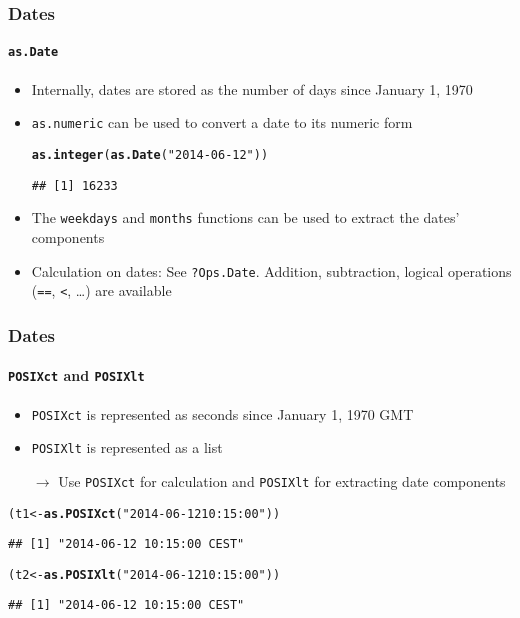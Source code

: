 \documentclass[paper=screen,mathserif]{beamer}\usepackage[]{graphicx}\usepackage[]{color}
\makeatletter
\newcommand{\hlstr}[1]{\textcolor[rgb]{0.192,0.494,0.8}{#1}}%
\newcommand{\hlstd}[1]{\textcolor[rgb]{0.345,0.345,0.345}{#1}}%
\newcommand{\hlkwb}[1]{\textcolor[rgb]{0.69,0.353,0.396}{#1}}%
\newcommand{\hlkwd}[1]{\textcolor[rgb]{0.737,0.353,0.396}{\textbf{#1}}}%
\newenvironment{kframe}{%
 \def\at@end@of@kframe{}%
 \ifinner\ifhmode%
  \def\at@end@of@kframe{\end{minipage}}%
  \begin{minipage}{\columnwidth}%
 \fi\fi%
 \def\FrameCommand##1{\hskip\@totalleftmargin \hskip-\fboxsep
 \colorbox{shadecolor}{##1}\hskip-\fboxsep
     \hskip-\linewidth \hskip-\@totalleftmargin \hskip\columnwidth}%
 \MakeFramed {\advance\hsize-\width
   \@totalleftmargin\z@ \linewidth\hsize
   \@setminipage}}%
 {\par\unskip\endMakeFramed%
 \at@end@of@kframe}
\newenvironment{knitrout}{}{} %
\newcommand{\ft}[1]{\frametitle{#1}}
\newcommand{\fst}[1]{\framesubtitle{#1}}
\makeatother
\begin{document}
\begin{frame}[fragile]
  \ft{Dates}
  \fst{{\tt as.Date}}
  
  \begin{itemize}
  \item Internally, dates are stored as the number of days since
    January 1, 1970
  \item {\tt as.numeric} can be used to convert a date to its numeric form
\begin{knitrout}\small
{}\color{fgcolor}\begin{kframe}
\begin{alltt}
\hlkwd{as.integer}\hlstd{(}\hlkwd{as.Date}\hlstd{(}\hlstr{"2014-06-12"}\hlstd{))}
\end{alltt}
\begin{verbatim}
## [1] 16233
\end{verbatim}
\end{kframe}
\end{knitrout}
  \item The \verb=weekdays= and \verb=months= functions can be used to
    extract the dates' components
  \item Calculation on dates: See \verb=?Ops.Date=. Addition,
    subtraction, logical operations (\verb|==|, \verb=<=, \dots) are
    available

  \end{itemize}
\end{frame}

\begin{frame}[fragile]
  \ft{Dates}
  \fst{{\tt POSIXct} and {\tt POSIXlt}}
  
  \begin{itemize}
  \item \verb=POSIXct= is represented as seconds since January 1, 1970 GMT
  \item \verb=POSIXlt= is represented as a list
    \vspace{0.3cm}
    
    $\rightarrow$ Use \verb=POSIXct= for calculation and
    \verb=POSIXlt= for extracting date components
  \end{itemize}
  
\begin{knitrout}\scriptsize
{}\color{fgcolor}\begin{kframe}
\begin{alltt}
\hlstd{(t1} \hlkwb{<-} \hlkwd{as.POSIXct}\hlstd{(}\hlstr{"2014-06-12 10:15:00"}\hlstd{))}
\end{alltt}
\begin{verbatim}
## [1] "2014-06-12 10:15:00 CEST"
\end{verbatim}
\begin{alltt}
\hlstd{(t2} \hlkwb{<-} \hlkwd{as.POSIXlt}\hlstd{(}\hlstr{"2014-06-12 10:15:00"}\hlstd{))}
\end{alltt}
\begin{verbatim}
## [1] "2014-06-12 10:15:00 CEST"
\end{verbatim}
\end{kframe}
\end{knitrout}
\end{frame}
\end{document}
